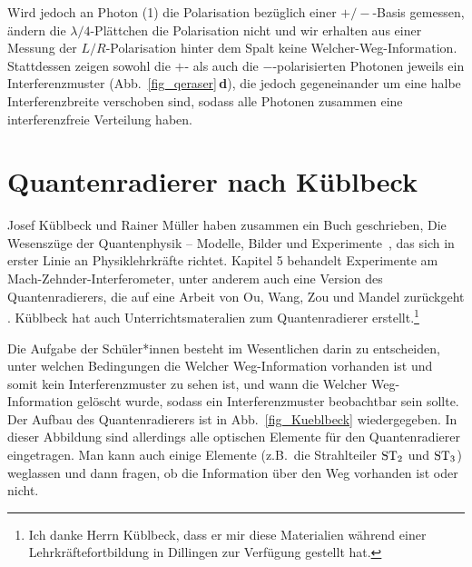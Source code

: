 Wird jedoch an Photon (1) die Polarisation 
bez\"uglich einer $+/-$-Basis gemessen,
\"andern die $\lambda/4$-Pl\"attchen die
Polarisation nicht und wir erhalten aus einer
Messung der $L/R$-Polarisation hinter dem
Spalt keine \glq Welcher-Weg\grq-Information.
Stattdessen zeigen sowohl die $+$- als auch
die $-$-polarisierten Photonen jeweils ein
Interferenzmuster (Abb.\ \ref{fig_qeraser}\,\textbf{d}),
die jedoch gegeneinander um eine
halbe Interferenzbreite verschoben sind,
sodass alle Photonen zusammen
eine interferenzfreie Verteilung haben.
 
\section{Quantenradierer nach K\"ublbeck}

Josef K\"ublbeck 
und Rainer M\"uller haben zusammen ein Buch geschrieben, \glqq Die Wesensz\"uge
der Quantenphysik -- Modelle, Bilder und Experimente\grqq\ \cite{Kueblbeck}, das sich in erster
Linie an Physiklehrkr\"afte richtet. 
Kapitel 5 behandelt Experimente am Mach-Zehnder-Interferometer,
unter anderem auch eine Version des Quantenradierers, die auf eine Arbeit von
Ou, Wang, Zou und Mandel zur\"uckgeht \cite{Ou}. K\"ublbeck hat auch Unterrichtsmateralien zum
Quantenradierer erstellt.\footnote{Ich danke Herrn K\"ublbeck, dass er mir diese Materialien
w\"ahrend einer Lehrkr\"aftefortbildung in Dillingen zur Verf\"ugung gestellt hat.}

Die Aufgabe der Sch\"uler*innen besteht im Wesentlichen darin zu entscheiden, unter welchen
Bedingungen die \glqq Welcher Weg\grqq-Information vorhanden ist und somit kein Interferenzmuster
zu sehen ist, und wann die \glqq Welcher Weg\grqq-Information gel\"oscht wurde, sodass ein
Interferenzmuster beobachtbar sein sollte. Der Aufbau des Quantenradierers ist in Abb.\ \ref{fig_Kueblbeck}
wiedergegeben. In dieser Abbildung sind allerdings alle optischen Elemente f\"ur den Quantenradierer
eingetragen. Man kann auch einige Elemente (z.B.\ die Strahlteiler ${\rm ST}_2$ und ${\rm ST}_3$)
weglassen und dann fragen, ob die Information \"uber den Weg vorhanden ist oder nicht. 

